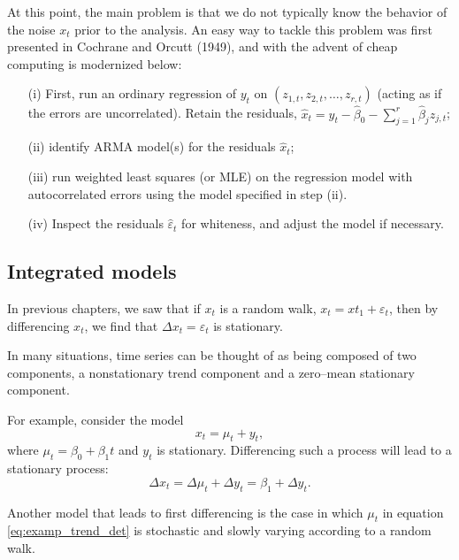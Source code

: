 \documentclass[
paper=128mm:96mm, %
fontsize=9.5pt, %
pagesize, %
parskip=half-, %
]{scrartcl} %
\theoremstyle{mythmstyle} %
\begin{document}
At this point, the main problem is that we do not typically know the behavior of the noise $x_t$ prior to the analysis. An easy way to tackle this problem was first presented in Cochrane and Orcutt (1949), and with the advent of cheap computing is modernized below:
%
\begin{itemize}
\item[(i)] First, run an ordinary regression of $y_t$ on $\left(z_{1,t},z_{2,t},\dots,z_{r,t}\right)$ (acting as if the errors are uncorrelated). Retain the residuals, $\widehat{x}_t=y_t-\widehat{\beta}_0-\sum_{j=1}^r\widehat{\beta}_jz_{j,t}$;
%
\item[(ii)] identify ARMA model(s) for the residuals $\widehat{x}_t$;
%
\item[(iii)] run weighted least squares (or MLE) on the regression model with
autocorrelated errors using the model specified in step (ii).
%
\item[(iv)] Inspect the residuals $\widehat{\varepsilon}_t$ for whiteness, and adjust the model if necessary.
\end{itemize}
\clearpage




\subsection{Integrated models}

In previous chapters, we saw that if $x_t$ is a random walk, $x_t=x{t_1}+\varepsilon_t$, then by differencing $x_t$, we find that $\Delta x_t=\varepsilon_t$ is stationary. 

In many situations, time series can be thought of as being composed of two components, a nonstationary trend component and a zero--mean stationary component. 

For example, consider the model
%
\begin{equation}
x_t=\mu_t+y_t,\nonumber
\end{equation}
%
where $\mu_t=\beta_0+\beta_1 t$ and $y_t$ is stationary. Differencing such a process will lead to a stationary process:
%
\begin{equation}
\label{eq:examp_trend_det}
\Delta x_t=\Delta \mu_t+\Delta y_t=\beta_1+\Delta y_t.
\end{equation}
%
\clearpage

Another model that leads to first differencing is the case in which $\mu_t$ in equation \eqref{eq:examp_trend_det} is stochastic and slowly varying according to a random walk. 
\end{document}
